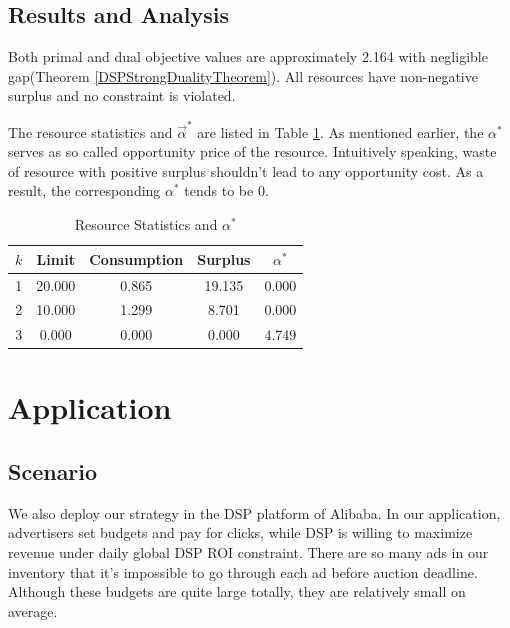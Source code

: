 \documentclass{article}
\newcommand{\valpha}{\vec{\alpha}}
\begin{document}
\subsection{Results and Analysis}

Both primal and dual objective values are approximately 2.164 with negligible gap(Theorem \ref{DSPStrongDualityTheorem}).
All resources have non-negative surplus and no constraint is violated.

The resource statistics and $\valpha^*$ are listed in Table \ref{TableStatisticsAndAlpha}.
As mentioned earlier, the $\alpha^*$ serves as so called opportunity price of the resource.
Intuitively speaking, waste of resource with positive surplus shouldn't lead to any opportunity cost.
As a result, the corresponding $\alpha^*$ tends to be 0.

\begin{table}
\caption{Resource Statistics and $\alpha^*$\label{TableStatisticsAndAlpha}}
\begin{center}
\begin{tabular}{|c|c|c|c|c|}
\hline
$k$   & Limit    & Consumption & Surplus      & $\alpha^*$ \\
\hline
1     & 20.000   & 0.865       & 19.135       & 0.000 \\
\hline
2     & 10.000   & 1.299       & 8.701        & 0.000 \\
\hline
3     & 0.000    & 0.000       & 0.000        & 4.749 \\
\hline
\end{tabular}
\end{center}
\end{table}

\section{Application} \label{Application}

\subsection{Scenario}

We also deploy our strategy in the DSP platform of Alibaba.
In our application, advertisers set budgets and pay for clicks, while DSP is willing to maximize revenue under daily global DSP ROI constraint.
There are so many ads in our inventory that it's impossible to go through each ad before auction deadline.
Although these budgets are quite large totally, they are relatively small on average.
\end{document}
